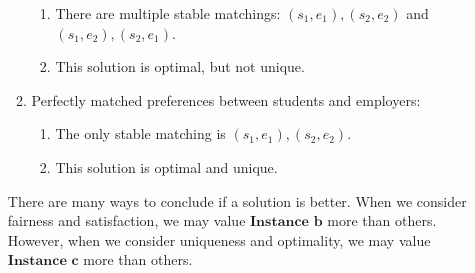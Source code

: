 \documentclass[12pt]{article}
\begin{document}
\begin{enumerate}
\begin{enumerate}
\begin{enumerate}[-]
                    \item There are multiple stable matchings: 
                    $(s_1, e_1), (s_2, e_2)$ and $(s_1, e_2), (s_2, e_1)$.
                    \item This solution is optimal, but not unique.
                \end{enumerate}
                \item Perfectly matched preferences between students and employers:
                \begin{enumerate}[-]
                    \item The only stable matching is $(s_1, e_1), (s_2, e_2)$.
                    \item This solution is optimal and unique.
                \end{enumerate}
            \end{enumerate}
            There are many ways to conclude if a solution is better.
            When we consider fairness and satisfaction, we may value $\textbf{Instance b}$ more than 
            others. However, when we consider uniqueness and optimality, 
            we may value $\textbf{Instance c}$ more than others.
    \end{enumerate}
\end{document}
